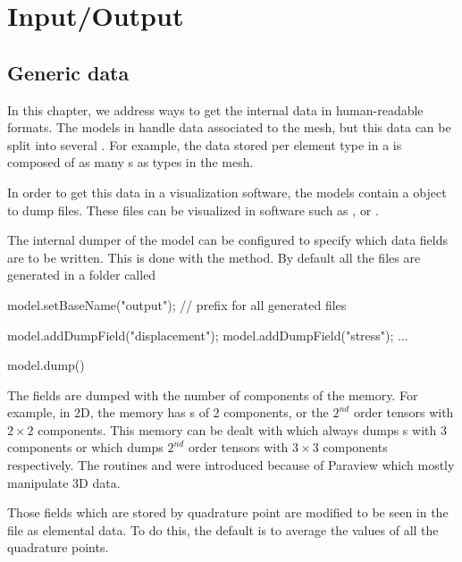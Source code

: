 
\chapter{Input/Output}

\section{Generic data}
In this chapter, we address ways to get the internal data in human-readable formats.
The models in \akantu handle data associated to the
mesh, but this data can be split into several . For example, the
data stored per element type in a  is composed of as
many s as types in the mesh.

In order to get this data in a visualization software, the models contain a
object to dump  files. These files can be visualized in software such
as \cite{paraview}, \cite{visit} or \cite{mayavi}.

The internal dumper of the model can be configured to specify which data fields
are to be written. This is done with the
 method. By default all the files
are generated in a folder called 

\begin{cpp}
  model.setBaseName("output"); // prefix for all generated files

  model.addDumpField("displacement");
  model.addDumpField("stress");
  ...

  model.dump()
\end{cpp}

The fields are dumped with the number of components of the memory. For example, in 2D, the memory has 
s of 2 components, or the $2^{nd}$ order tensors with $2\times2$ components.  
This memory can be dealt with  which always dumps
s with 3 components or  which dumps $2^{nd}$
order tensors with $3\times3$ components respectively. The routines  and
 were introduced because of Paraview which mostly manipulate 3D 
data.

Those fields which are stored by quadrature point are modified to be seen in the
 file as elemental data. To do this, the default is to average the
values of all the quadrature points.

